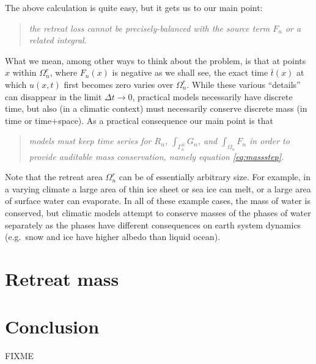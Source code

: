 \documentclass[final,leqno,onefignum,onetabnum]{siamltex1213bueler}
\begin{document}
The above calculation is quite easy, but it gets us to our main point:
\begin{quote}
\emph{the retreat loss cannot be precisely-balanced with the source term $F_n$ or a related integral.}
\end{quote}
What we mean, among other ways to think about the problem, is that at points $x$ within $\Omega_n^r$, where $F_n(x)$ is negative as we shall see, the exact time $\bar t(x)$ at which $u(x,t)$ first becomes zero varies over $\Omega_n^r$.  While these various ``details'' can disappear in the limit $\Delta t \to 0$, practical models necessarily have discrete time, but also (in a climatic context) must necessarily conserve discrete mass (in time or time+space).  As a practical consequence our main point is that
\begin{quote}
\emph{models must keep time series for $R_n$, $\int_{\Gamma_n^N} G_n$, and $\int_{\Omega_n} F_n$ in order to provide auditable mass conservation, namely equation \eqref{eq:massstep}.}
\end{quote}

Note that the retreat area $\Omega_n^r$ can be of essentially arbitrary size.  For example, in a varying climate a large area of thin ice sheet or sea ice can melt, or a large area of surface water can evaporate.  In all of these example cases, the mass of water is conserved, but climatic models attempt to conserve masses of the phases of water separately as the phases have different consequences on earth system dynamics (e.g.~snow and ice have higher albedo than liquid ocean).

\section{Retreat mass}


\section{Conclusion}  FIXME





\end{document}
